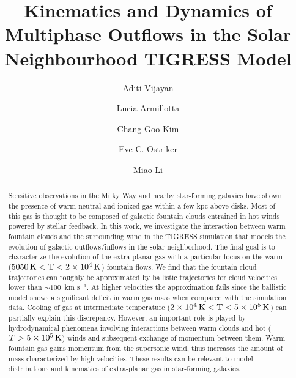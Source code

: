 \documentclass[twocolumn]{aastex62}
\newcommand{\kmps}{km s$^{-1}$}
\begin{document}
\title{Kinematics and Dynamics of Multiphase Outflows in the Solar Neighbourhood TIGRESS Model}

\author[0000-0002-0786-7307]{Aditi Vijayan}

\author{Lucia Armillotta}

\author[0000-0003-2896-3725]{Chang-Goo Kim}

\author[0000-0002-0509-9113]{Eve C. Ostriker}

\author{Miao Li}

\begin{abstract}
Sensitive observations in the Milky Way and nearby star-forming galaxies have shown the presence of warm neutral and ionized gas within a few kpc above disks. Most of this gas is thought to be composed of galactic fountain clouds entrained in hot winds powered by stellar feedback. In this work, we investigate the interaction between warm fountain clouds and the surrounding wind in the TIGRESS simulation that models the evolution of galactic outflows/inflows in the solar neighborhood. The final goal is to characterize the evolution of the extra-planar gas with a particular focus on the warm ($5050\,\rm{K}<T<2\times10^4\,\rm{K}$) fountain flows. We find that the fountain cloud trajectories can roughly be approximated by ballistic trajectories for cloud velocities lower than $\sim 100$~\kmps. At higher velocities the approximation fails since the ballistic model shows a significant deficit in warm gas mass when compared with the simulation data. Cooling of gas at intermediate temperature ($2\times10^4\,\rm{K}<T<5\times10^5\,\rm{K}$) can partially explain this discrepancy. However, an important role is played by hydrodynamical phenomena involving interactions between warm clouds and hot ($T>5\times10^5\,\rm{K}$) winds and subsequent exchange of momentum between them. Warm fountain gas gains momentum from the supersonic wind, thus increases the amount of mass characterized by high velocities. These results can be relevant to model distributions and kinematics of extra-planar gas in star-forming galaxies.   

\end{abstract}
\end{document}
